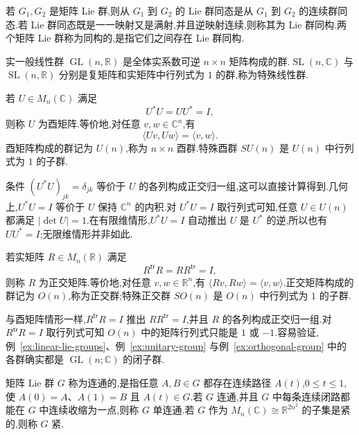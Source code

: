 \begin{definition}\label{def:lie-group-homomorphism}
若 $G_1,G_2$ 是矩阵 Lie 群,则从 $G_1$ 到 $G_2$ 的 Lie 群同态是从 $G_1$ 到 $G_2$ 的连续群同态.若 Lie 群同态既是一一映射又是满射,并且逆映射连续,则称其为 Lie 群同构.两个矩阵 Lie 群称为同构的,是指它们之间存在 Lie 群同构.
\end{definition}

\begin{example}[一般线性群与特殊线性群]\label{ex:linear-lie-groups}
实一般线性群 $\operatorname{GL}(n,\mathbb R)$ 是全体实系数可逆 $n\times n$ 矩阵构成的群.$\operatorname{SL}(n,\mathbb C)$ 与 $\operatorname{SL}(n,\mathbb R)$ 分别是复矩阵和实矩阵中行列式为 $1$ 的群,称为特殊线性群.
\end{example}

\begin{example}[酉群]\label{ex:unitary-group}
若 $U\in M_n(\mathbb C)$ 满足
\[
U^*U=UU^*=I,
\]
则称 $U$ 为酉矩阵.等价地,对任意 $v,w\in\mathbb C^n$,有
\[
\langle Uv,Uw\rangle=\langle v,w\rangle.
\]
酉矩阵构成的群记为 $U(n)$,称为 $n\times n$ 酉群.特殊酉群 $SU(n)$ 是 $U(n)$ 中行列式为 $1$ 的子群.
\end{example}

条件 $(U^*U)_{jk}=\delta_{jk}$ 等价于 $U$ 的各列构成正交归一组,这可以直接计算得到.几何上,$U^*U=I$ 等价于 $U$ 保持 $\mathbb C^n$ 的内积.对 $U^*U=I$ 取行列式可知,任意 $U\in U(n)$ 都满足 $|\det U|=1$.在有限维情形,$U^*U=I$ 自动推出 $U$ 是 $U^*$ 的逆,所以也有 $UU^*=I$;无限维情形并非如此.

\begin{example}[正交群]\label{ex:orthogonal-group}
若实矩阵 $R\in M_n(\mathbb R)$ 满足
\[
R^{\mathsf{tr}}R=RR^{\mathsf{tr}}=I,
\]
则称 $R$ 为正交矩阵.等价地,对任意 $v,w\in\mathbb R^n$,有 $\langle Rv,Rw\rangle=\langle v,w\rangle$.正交矩阵构成的群记为 $O(n)$,称为正交群;特殊正交群 $SO(n)$ 是 $O(n)$ 中行列式为 $1$ 的子群.
\end{example}

与酉矩阵情形一样,$R^{\mathsf{tr}}R=I$ 推出 $RR^{\mathsf{tr}}=I$,并且 $R$ 的各列构成正交归一组.对 $R^{\mathsf{tr}}R=I$ 取行列式可知 $O(n)$ 中的矩阵行列式只能是 $1$ 或 $-1$.容易验证,例~\ref{ex:linear-lie-groups}、例~\ref{ex:unitary-group} 与例~\ref{ex:orthogonal-group} 中的各群确实都是 $\operatorname{GL}(n;\mathbb C)$ 的闭子群.

\begin{definition}[连通、单连通与紧]\label{def:connected-simply-connected-compact}
矩阵 Lie 群 $G$ 称为连通的,是指任意 $A,B\in G$ 都存在连续路径 $A(t)$,$0\leq t\leq1$,使 $A(0)=A$、$A(1)=B$ 且 $A(t)\in G$.若 $G$ 连通,并且 $G$ 中每条连续闭路都能在 $G$ 中连续收缩为一点,则称 $G$ 单连通.若 $G$ 作为 $M_n(\mathbb C)\cong\mathbb R^{2n^2}$ 的子集是紧的,则称 $G$ 紧.
\end{definition}

